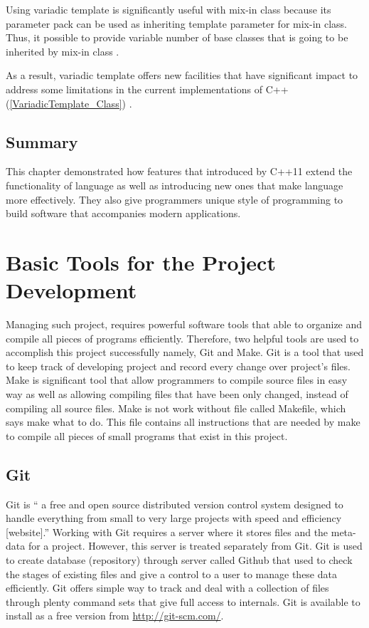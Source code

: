 \documentclass[11pt]{report}
\begin{document}
Using variadic template is significantly useful with mix-in class because its parameter pack can be used as inheriting template parameter for mix-in class. Thus, it possible to provide variable number of base classes that is going to be inherited by mix-in class \cite{Gregor:2007:VTC}.


As a result, variadic template offers new facilities that have significant impact to address some limitations in the current implementations of C++ (\ref{VariadicTemplate_Class}) \cite{Gregor:2007:VTC}.

\section{Summary}
\label{section1: Summary}
This chapter demonstrated how features that introduced by C++11 extend the functionality of language as well as introducing new ones that make language more effectively. They also give programmers unique style of programming to build software that accompanies modern applications.

\chapter{Basic Tools for the Project Development}
\label{cha: tools}
Managing such project, requires powerful software tools that able to organize and compile all pieces of programs efficiently. Therefore, two helpful tools are used to accomplish this project successfully namely, Git and Make. Git is a tool that used to keep track of developing project and record every change over project's files. Make is significant tool that allow programmers to compile source files in easy way as well as allowing compiling files that have been only changed, instead of compiling all source files. Make is not work without file called Makefile, which says make what to do. This file contains all instructions that are needed by make to compile all pieces of small programs that exist in this project.

\section{Git}
\label{sec: Git}
Git is “ a free and open source distributed version control system designed to handle everything from small to very large projects with speed and efficiency [website].”  Working with Git requires a server where it stores files and the meta-data for a project. However, this server is treated separately from Git.  Git is used to create database (repository) through server called Github that used to check the stages of existing files and give a control to a user to manage these data efficiently. Git offers simple way to track and deal with a collection of files through plenty command sets that give full access to internals. Git is available to install as a free version from  \url{http://git-scm.com/}.
\end{document}
